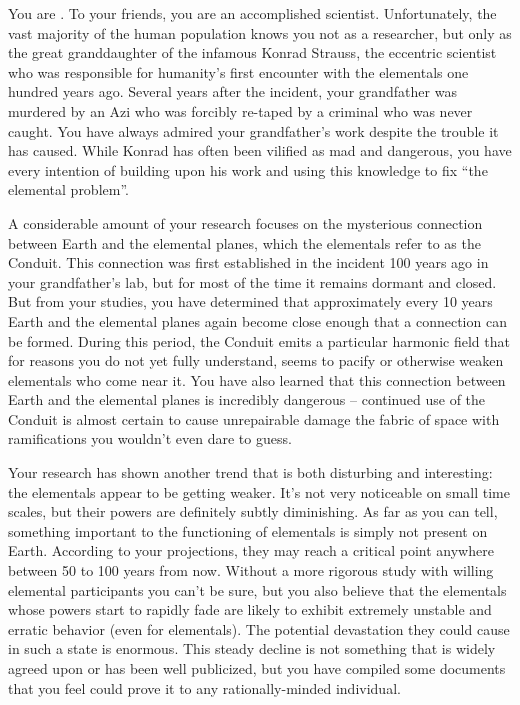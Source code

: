 \documentclass[char]{guildcamp1}
\begin{document}
\name{\cGD{}}

You are \cGD{\intro}. To your friends, you are an accomplished scientist. Unfortunately, the vast majority of the human population knows you not as a researcher, but only as the great granddaughter of the infamous Konrad Strauss, the eccentric scientist who was responsible for humanity's first encounter with the elementals one hundred years ago. Several years after the incident, your grandfather was murdered by an Azi who was forcibly re-taped by a criminal who was never caught. You have always admired your grandfather's work despite the trouble it has caused. While Konrad has often been vilified as mad and dangerous, you have every intention of building upon his work and using this knowledge to fix ``the elemental problem''.

A considerable amount of your research focuses on the mysterious connection between Earth and the elemental planes, which the elementals refer to as the Conduit. This connection was first established in the incident 100 years ago in your grandfather's lab, but for most of the time it remains dormant and closed. But from your studies, you have determined that approximately every 10 years Earth and the elemental planes again become close enough that a connection can be formed. During this period, the Conduit emits a particular harmonic field that for reasons you do not yet fully understand, seems to pacify or otherwise weaken elementals who come near it. You have also learned that this connection between Earth and the elemental planes is incredibly dangerous -- continued use of the Conduit is almost certain to cause unrepairable damage the fabric of space with ramifications you wouldn't even dare to guess.

Your research has shown another trend that is both disturbing and interesting: the elementals appear to be getting weaker. It's not very noticeable on small time scales, but their powers are definitely subtly diminishing. As far as you can tell, something important to the functioning of elementals is simply not present on Earth. According to your projections, they may reach a critical point anywhere between 50 to 100 years from now. Without a more rigorous study with willing elemental participants you can't be sure, but you also believe that the elementals whose powers start to rapidly fade are likely to exhibit extremely unstable and erratic behavior (even for elementals). The potential devastation they could cause in such a state is enormous. This steady decline is not something that is widely agreed upon or has been well publicized, but you have compiled some documents that you feel could prove it to any rationally-minded individual.
\end{document}
